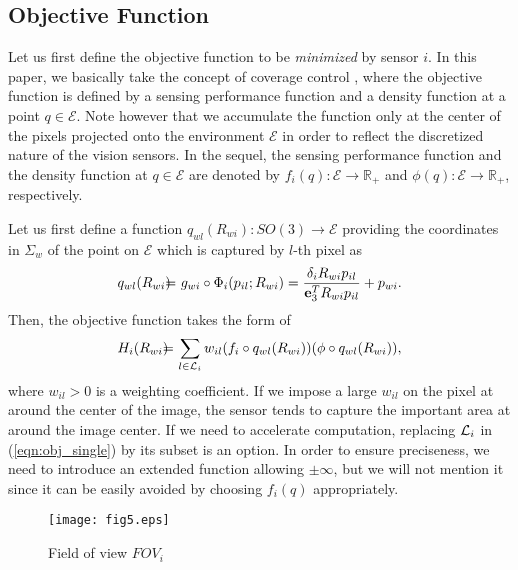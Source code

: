 \documentclass[conference,letterpaper]{ieeeconf}
\newcommand{\E}{{\mathcal E}}
\newcommand{\R}{{\mathbb R}}
\newcommand{\ewi}{R_{wi}}
\renewcommand{\L}{{\cal L}}
\begin{document}
\subsection{Objective Function}



Let us first define the objective function
to be {\it minimized} by sensor $i$.
In this paper, we basically take the concept of coverage control \cite{CL_EJC05,BCM_BK09}, 
where the objective function is defined by 
a sensing performance function and a density function at 
a point $q \in \E$.
Note however that
we accumulate the function only at the center of the pixels
projected onto the environment $\E$ in order to reflect
the discretized nature of the vision sensors.
In the sequel, the sensing performance function and the density function
at $q \in \E$ are denoted by
$f_i(q): \E \to \R_+$ and 
$\phi(q): \E \to \R_+$, respectively.









Let us first define a function $q_{wl}(\ewi): SO(3) \to \E$ 
providing the coordinates in $\Sigma_w$ of the point on $\E$
which is captured by $l$-th pixel as
\begin{eqnarray}
q_{wl}(\ewi) \!\!&\!\!=\!\!&\!\! g_{wi}\circ \Phi_i(p_{il};\ewi)  
= \frac{\delta_i \ewi p_{il}}{{\bf e}_3^T \ewi p_{il}} + p_{wi}.
\label{eqn:q_wl}
\end{eqnarray}
Then, the objective function takes the form of
\begin{eqnarray}
H_i(\ewi) \!\!&\!\!=\!\!&\!\! \sum_{l \in \L_i} w_{il} (f_i\circ q_{wl}(\ewi)) (\phi \circ q_{wl}(\ewi)),
\label{eqn:obj_single}
\end{eqnarray}
where $w_{il} > 0$ is a weighting coefficient.
If we impose a large $w_{il}$ on the pixel at around the center of the image,
the sensor tends to capture the important area at around the image center.
If we need to accelerate computation, 
replacing $\L_i$ in (\ref{eqn:obj_single}) by its subset
is an option.
In order to ensure preciseness, we need to introduce an extended function
allowing $\pm \infty$, but we will not mention it
since it can be easily avoided by choosing
$f_i(q)$ appropriately.



\begin{figure}[t]
\begin{center}
\texttt{[image: fig5.eps]}
\caption{Field of view $FOV_i$}
\label{fig:FOV2}
\end{center}
\end{figure}
\end{document}
